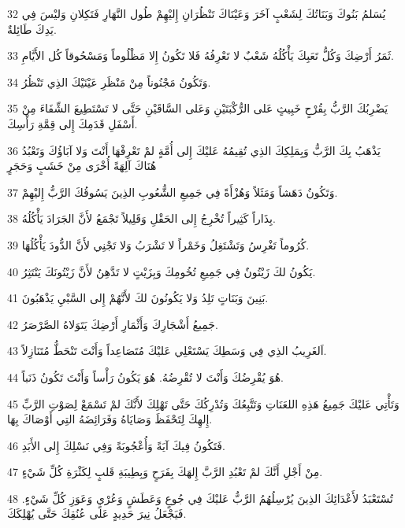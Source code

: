 \par 32 يُسَلمُ بَنُوكَ وَبَنَاتُكَ لِشَعْبٍ آخَرَ وَعَيْنَاكَ تَنْظُرَانِ إِليْهِمْ طُول النَّهَارِ فَتَكِلانِ وَليْسَ فِي يَدِكَ طَائِلةٌ.
\par 33 ثَمَرُ أَرْضِكَ وَكُلُّ تَعَبِكَ يَأْكُلُهُ شَعْبٌ لا تَعْرِفُهُ فَلا تَكُونُ إِلا مَظْلُوماً وَمَسْحُوقاً كُل الأَيَّامِ.
\par 34 وَتَكُونُ مَجْنُوناً مِنْ مَنْظَرِ عَيْنَيْكَ الذِي تَنْظُرُ.
\par 35 يَضْرِبُكَ الرَّبُّ بِقُرْحٍ خَبِيثٍ عَلى الرُّكْبَتَيْنِ وَعَلى السَّاقَيْنِ حَتَّى لا تَسْتَطِيعَ الشِّفَاءَ مِنْ أَسْفَلِ قَدَمِكَ إِلى قِمَّةِ رَأْسِكَ.
\par 36 يَذْهَبُ بِكَ الرَّبُّ وَبِمَلِكِكَ الذِي تُقِيمُهُ عَليْكَ إِلى أُمَّةٍ لمْ تَعْرِفْهَا أَنْتَ وَلا آبَاؤُكَ وَتَعْبُدُ هُنَاكَ آلِهَةً أُخْرَى مِنْ خَشَبٍ وَحَجَرٍ
\par 37 وَتَكُونُ دَهَشاً وَمَثَلاً وَهُزْأَةً فِي جَمِيعِ الشُّعُوبِ الذِينَ يَسُوقُكَ الرَّبُّ إِليْهِمْ.
\par 38 بِذَاراً كَثِيراً تُخْرِجُ إِلى الحَقْلِ وَقَلِيلاً تَجْمَعُ لأَنَّ الجَرَادَ يَأْكُلُهُ.
\par 39 كُرُوماً تَغْرِسُ وَتَشْتَغِلُ وَخَمْراً لا تَشْرَبُ وَلا تَجْنِي لأَنَّ الدُّودَ يَأْكُلُهَا.
\par 40 يَكُونُ لكَ زَيْتُونٌ فِي جَمِيعِ تُخُومِكَ وَبِزَيْتٍ لا تَدَّهِنُ لأَنَّ زَيْتُونَكَ يَنْتَثِرُ.
\par 41 بَنِينَ وَبَنَاتٍ تَلِدُ وَلا يَكُونُونَ لكَ لأَنَّهُمْ إِلى السَّبْيِ يَذْهَبُونَ.
\par 42 جَمِيعُ أَشْجَارِكَ وَأَثْمَارِ أَرْضِكَ يَتَوَلاهُ الصَّرْصَرُ.
\par 43 اَلغَرِيبُ الذِي فِي وَسَطِكَ يَسْتَعْلِي عَليْكَ مُتَصَاعِداً وَأَنْتَ تَنْحَطُّ مُتَنَازِلاً.
\par 44 هُوَ يُقْرِضُكَ وَأَنْتَ لا تُقْرِضُهُ. هُوَ يَكُونُ رَأْساً وَأَنْتَ تَكُونُ ذَنَباً.
\par 45 وَتَأْتِي عَليْكَ جَمِيعُ هَذِهِ اللعَنَاتِ وَتَتَّبِعُكَ وَتُدْرِكُكَ حَتَّى تَهْلِكَ لأَنَّكَ لمْ تَسْمَعْ لِصَوْتِ الرَّبِّ إِلهِكَ لِتَحْفَظَ وَصَايَاهُ وَفَرَائِضَهُ التِي أَوْصَاكَ بِهَا.
\par 46 فَتَكُونُ فِيكَ آيَةً وَأُعْجُوبَةً وَفِي نَسْلِكَ إِلى الأَبَدِ.
\par 47 مِنْ أَجْلِ أَنَّكَ لمْ تَعْبُدِ الرَّبَّ إِلهَكَ بِفَرَحٍ وَبِطِيبَةِ قَلبٍ لِكَثْرَةِ كُلِّ شَيْءٍ.
\par 48 تُسْتَعْبَدُ لأَعْدَائِكَ الذِينَ يُرْسِلُهُمُ الرَّبُّ عَليْكَ فِي جُوعٍ وَعَطَشٍ وَعُرْيٍ وَعَوَزِ كُلِّ شَيْءٍ. فَيَجْعَلُ نِيرَ حَدِيدٍ عَلى عُنُقِكَ حَتَّى يُهْلِكَكَ.
